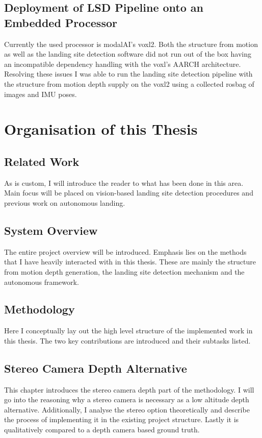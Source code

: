 \subsection{Deployment of LSD Pipeline onto an Embedded Processor}
Currently the used processor is modalAI's voxl2. Both the structure from motion as well as the landing site detection software did not run out of the box having an incompatible dependency handling with the voxl's AARCH architecture. Resolving these issues I was able to run the landing site detection pipeline with the structure from motion depth supply on the voxl2 using a collected rosbag of images and IMU poses.

\section{Organisation of this Thesis}
\subsection{Related Work}
As is custom, I will introduce the reader to what has been done in this area. Main focus will be placed on vision-based landing site detection procedures and previous work on autonomous landing.
\subsection{System Overview}
The entire project overview will be introduced. Emphasis lies on the methods that I have heavily interacted with in this thesis. These are mainly the structure from motion depth generation, the landing site detection mechanism and the autonomous framework.
\subsection{Methodology}
Here I conceptually lay out the high level structure of the implemented work in this thesis. The two key contributions are introduced and their subtasks listed.
\subsection{Stereo Camera Depth Alternative}
This chapter introduces the stereo camera depth part of the methodology. I will go into the reasoning why a stereo camera is necessary as a low altitude depth alternative. Additionally, I analyse the stereo option theoretically and describe the process of implementing it in the existing project structure. Lastly it is qualitatively compared to a depth camera based ground truth.

